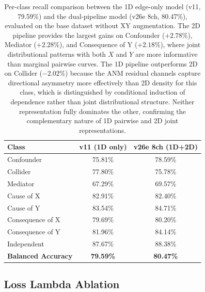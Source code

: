 \begin{table}[ht]
	\centering
	\caption{Per-class recall comparison between the 1D edge-only model (v11, 79.59\%) and the dual-pipeline model (v26e 8ch, 80.47\%), evaluated on the base dataset without XY augmentation. The 2D pipeline provides the largest gains on Confounder ($+2.78\%$), Mediator ($+2.28\%$), and Consequence of Y ($+2.18\%$), where joint distributional patterns with both $X$ and $Y$ are more informative than marginal pairwise curves. The 1D pipeline outperforms 2D on Collider ($-2.02\%$) because the ANM residual channels capture directional asymmetry more effectively than 2D density for this class, which is distinguished by conditional induction of dependence rather than joint distributional structure. Neither representation fully dominates the other, confirming the complementary nature of 1D pairwise and 2D joint representations.}
	\label{tab:1d_vs_2d}
	\begin{tabular}{lcc}
		\toprule
		\textbf{Class}              & \textbf{v11 (1D only)} & \textbf{v26e 8ch (1D+2D)} \\
		\midrule
		Confounder                 & 75.81\%                & 78.59\%                   \\
		Collider                   & 77.80\%                & 75.78\%                   \\
		Mediator                   & 67.29\%                & 69.57\%                   \\
		Cause of X                 & 82.91\%                & 82.40\%                   \\
		Cause of Y                 & 83.54\%                & 84.71\%                   \\
		Consequence of X           & 79.69\%                & 80.20\%                   \\
		Consequence of Y           & 81.96\%                & 84.14\%                   \\
		Independent                & 87.67\%                & 88.38\%                   \\
		\midrule
		\textbf{Balanced Accuracy} & \textbf{79.59\%}       & \textbf{80.47\%}          \\
		\bottomrule
	\end{tabular}
\end{table}

\subsection{Loss Lambda Ablation}

